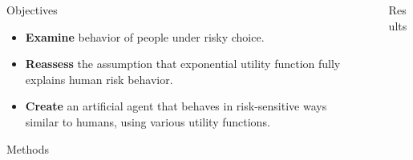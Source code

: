 \documentclass[final]{beamer}
\newlength{\sepwid}
\newlength{\onecolwid}
\begin{document}
\begin{frame}
\begin{columns}[t]
\begin{column}{\onecolwid}
\begin{exampleblock}{Objectives}

\begin{itemize}
\item \textbf{Examine} behavior of people under risky choice.
\item \textbf{Reassess} the assumption that exponential utility function fully explains human risk behavior.
\item \textbf{Create} an artificial agent that behaves in risk-sensitive ways similar to humans, using various utility functions.
\end{itemize}

\end{exampleblock}


\begin{exampleblock}{Methods}



\end{exampleblock}

\end{column} %






\begin{column}{\sepwid}\end{column} %

\begin{column}{\onecolwid} %

\begin{exampleblock}{Results}


\end{exampleblock}
\end{column}
\end{columns}
\end{frame}
\end{document}
